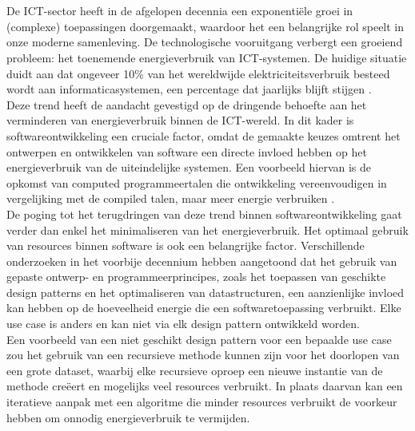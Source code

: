 
\chapter{}%
\label{ch:inleiding}
De ICT-sector heeft in de afgelopen decennia een exponentiële groei in (complexe) toepassingen doorgemaakt, waardoor het een belangrijke rol speelt in onze moderne samenleving. De technologische vooruitgang verbergt een groeiend probleem: het toenemende energieverbruik van ICT-systemen. De huidige situatie duidt aan dat ongeveer 10\% van het wereldwijde elektriciteitsverbruik besteed wordt aan informaticasystemen, een percentage dat jaarlijks blijft stijgen \autocite{Gelenbe2023}.\\

Deze trend heeft de aandacht gevestigd op de dringende behoefte aan het verminderen van energieverbruik binnen de ICT-wereld. In dit kader is softwareontwikkeling een cruciale factor, omdat de gemaakte keuzes omtrent het ontwerpen en ontwikkelen van software een directe invloed hebben op het energieverbruik van de uiteindelijke systemen. Een voorbeeld hiervan is de opkomst van computed programmeertalen die ontwikkeling vereenvoudigen in vergelijking met de compiled talen, maar meer energie verbruiken \autocite{Manner2022}.\\

De poging tot het terugdringen van deze trend binnen softwareontwikkeling gaat verder dan enkel het minimaliseren van het energieverbruik. Het optimaal gebruik van resources binnen software is ook een belangrijke factor. Verschillende onderzoeken in het voorbije decennium hebben aangetoond dat het gebruik van gepaste ontwerp- en programmeerprincipes, zoals het toepassen van geschikte design patterns en het optimaliseren van datastructuren, een aanzienlijke invloed kan hebben op de hoeveelheid energie die een softwaretoepassing verbruikt. Elke use case is anders en kan niet via elk design pattern ontwikkeld worden.\\

Een voorbeeld van een niet geschikt design pattern voor een bepaalde use case zou het gebruik van een recursieve methode kunnen zijn voor het doorlopen van een grote dataset, waarbij elke recursieve oproep een nieuwe instantie van de methode creëert en mogelijks veel resources verbruikt. In plaats daarvan kan een iteratieve aanpak met een algoritme die minder resources verbruikt de voorkeur hebben om onnodig energieverbruik te vermijden.

